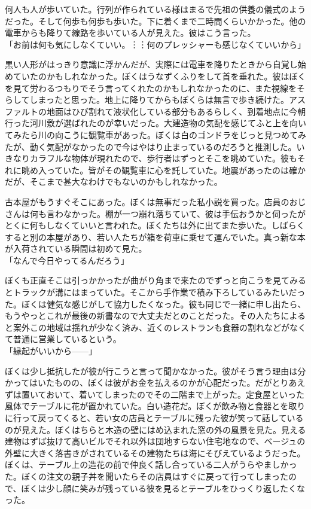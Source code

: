 \documentclass[b5j,twoside,twocolumn]{utarticle}
\begin{document}
何人も人が歩いていた。行列が作られている様はまるで先祖の供養の儀式のようだった。そして何歩も何歩も歩いた。下に着くまで二時間くらいかかった。他の電車からも降りて線路を歩いている人が見えた。彼はこう言った。\\
「お前は何も気にしなくていい。︙︙何のプレッシャーも感じなくていいから」


黒い人形がはっきり意識に浮かんだが、実際には電車を降りたときから自覚し始めていたのかもしれなかった。ぼくはうなずくふりをして首を垂れた。彼はぼくを見て労わるつもりでそう言ってくれたのかもしれなかったのに、また視線をそらしてしまったと思った。地上に降りてからもぼくらは無言で歩き続けた。アスファルトの地面はひび割れて液状化している部分もあるらしく、到着地点に今朝行った河川敷が選ばれたのが幸いだった。大建造物の気配を感じてふと上を向いてみたら川の向こうに観覧車があった。ぼくは白のゴンドラをじっと見つめてみたが、動く気配がなかったので今はやはり止まっているのだろうと推測した。いきなりカラフルな物体が現れたので、歩行者はずっとそこを眺めていた。彼もそれに眺め入っていた。皆がその観覧車に心を託していた。地震があったのは確かだが、そこまで甚大なわけでもないのかもしれなかった。


古本屋がもうすぐそこにあった。ぼくは無事だった私小説を買った。店員のおじさんは何も言わなかった。棚が一つ崩れ落ちていて、彼は手伝おうかと伺ったがとくに何もしなくていいと言われた。ぼくたちは外に出てまた歩いた。しばらくすると別の本屋があり、若い人たちが箱を荷車に乗せて運んでいた。真っ新な本が入荷されている瞬間は初めて見た。\\
「なんで今日やってるんだろう」


ぼくも正直そこは引っかかったが曲がり角まで来たのでずっと向こうを見てみるとトラックが溝にはまっていた。そこから手作業で積み下ろしているみたいだった。ぼくは健気な感じがして協力したくなった。彼も同じで一緒に申し出たら、もうやっとこれが最後の新書なので大丈夫だとのことだった。その人たちによると案外この地域は揺れが少なく済み、近くのレストランも食器の割れなどがなくて普通に営業しているという。\\
「縁起がいいから\tbaselineshift=2.5pt------\tbaselineshift=4.0pt」


ぼくは少し抵抗したが彼が行こうと言って聞かなかった。彼がそう言う理由は分かってはいたものの、ぼくは彼がお金を払えるのかが心配だった。だがとりあえずは置いておいて、着いてしまったのでその二階まで上がった。定食屋といった風体でテーブルに花が置かれていた。白い造花だ。ぼくが飲み物と食器とを取りに行って戻ってくると、若い女の店員とテーブルに残った彼が笑って話しているのが見えた。ぼくはちらと木造の壁にはめ込まれた窓の外の風景を見た。見える建物はずば抜けて高いビルでそれ以外は団地すらない住宅地なので、ベージュの外壁に大きく落書きがされているその建物たちは海にそびえているようだった。ぼくは、テーブル上の造花の前で仲良く話し合っている二人がうらやましかった。ぼくの注文の親子丼を聞いたらその店員はすぐに戻って行ってしまったので、ぼくは少し顔に笑みが残っている彼を見るとテーブルをひっくり返したくなった。
\end{document}
